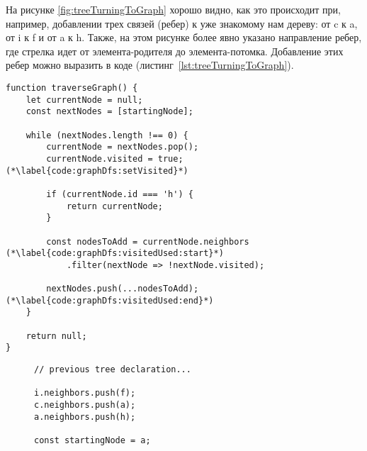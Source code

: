 \documentclass[../../article.tex]{subfiles}
\begin{document}
На рисунке \ref{fig:treeTurningToGraph} хорошо видно, как это происходит при, например, добавлении трех связей (ребер) к уже знакомому нам дереву: от {\firacodebold c} к {\firacodebold a}, от {\firacodebold i} к {\firacodebold f} и от {\firacodebold a} к {\firacodebold h}. Также, на этом рисунке более явно указано направление ребер, где стрелка идет от элемента-родителя до элемента-потомка. Добавление этих ребер можно выразить в коде (листинг~\ref{lst:treeTurningToGraph}).

\begin{figure*}
    \begin{ruledelement}
        \begin{lstlisting}[caption={Обход графа в глубину}, label={lst:graphDfs}]
function traverseGraph() {
    let currentNode = null;
    const nextNodes = [startingNode];

    while (nextNodes.length !== 0) {
        currentNode = nextNodes.pop();
        currentNode.visited = true; (*\label{code:graphDfs:setVisited}*)

        if (currentNode.id === 'h') {
            return currentNode;
        }

        const nodesToAdd = currentNode.neighbors (*\label{code:graphDfs:visitedUsed:start}*)
            .filter(nextNode => !nextNode.visited);

        nextNodes.push(...nodesToAdd); (*\label{code:graphDfs:visitedUsed:end}*)
    }

    return null;
}
        \end{lstlisting}
    \end{ruledelement}

\end{figure*}

\begin{figure}
    \begin{ruledelement}
        \begin{lstlisting}[caption={Добавление связей превращающих дерево в грфа}, label={lst:treeTurningToGraph}]
// previous tree declaration...

i.neighbors.push(f);
c.neighbors.push(a);
a.neighbors.push(h);

const startingNode = a;
        \end{lstlisting}
    \end{ruledelement}
\end{figure}
\end{document}
